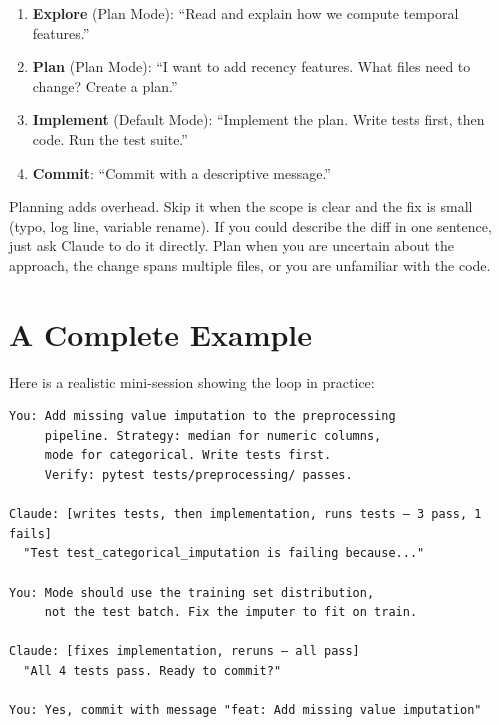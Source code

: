 


\begin{enumerate}
  \item \textbf{Explore} (Plan Mode): ``Read  and explain
    how we compute temporal features.''
  \item \textbf{Plan} (Plan Mode): ``I want to add recency features.
    What files need to change? Create a plan.''
  \item \textbf{Implement} (Default Mode): ``Implement the plan.
    Write tests first, then code. Run the test suite.''
  \item \textbf{Commit}: ``Commit with a descriptive message.''
\end{enumerate}

\begin{tipbox}
Planning adds overhead. Skip it when the scope is clear and the fix is small
(typo, log line, variable rename). If you could describe the diff
in one sentence, just ask Claude to do it directly.
Plan when you are uncertain about the approach, the change spans multiple files,
or you are unfamiliar with the code.
\end{tipbox}

\section{A Complete Example}
\label{sec:session-example}

Here is a realistic mini-session showing the loop in practice:

\begin{verbatim}
You: Add missing value imputation to the preprocessing
     pipeline. Strategy: median for numeric columns,
     mode for categorical. Write tests first.
     Verify: pytest tests/preprocessing/ passes.

Claude: [writes tests, then implementation, runs tests — 3 pass, 1 fails]
  "Test test_categorical_imputation is failing because..."

You: Mode should use the training set distribution,
     not the test batch. Fix the imputer to fit on train.

Claude: [fixes implementation, reruns — all pass]
  "All 4 tests pass. Ready to commit?"

You: Yes, commit with message "feat: Add missing value imputation"
\end{verbatim}


